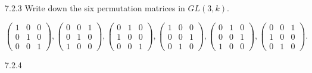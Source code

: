 \documentclass[twoside]{article}
\begin{document}
\begin{ejercicio}{7.2.3}
Write down the six permutation matrices in $GL(3, k)$.
\end{ejercicio}
\begin{solucion}
\[
\begin{pmatrix}
1 & 0 & 0\\
0 & 1 & 0\\
0 & 0 & 1
\end{pmatrix}, \begin{pmatrix}
0 & 0 & 1\\
0 & 1 & 0\\
1 & 0 & 0
\end{pmatrix},\begin{pmatrix}
0 & 1 & 0\\
1 & 0 & 0\\
0 & 0 & 1
\end{pmatrix}, \begin{pmatrix}
1 & 0 & 0\\
0 & 0 & 1\\
0 & 1 & 0
\end{pmatrix}, \begin{pmatrix}
0 & 1 & 0\\
0 & 0 & 1\\
1 & 0 & 0
\end{pmatrix},
\begin{pmatrix}
0 & 0 & 1\\
1 & 0 & 0\\
0 & 1 & 0
\end{pmatrix}.
\]

\end{solucion}
\newpage

\begin{ejercicio}{7.2.4}

\end{ejercicio}
\begin{solucion}

\end{solucion}

\newpage
\end{document}
